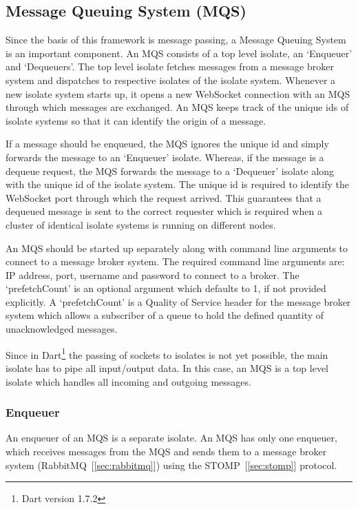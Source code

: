 \subsection{Message Queuing System (MQS)}
\label{subsec:mqs}
  Since the basis of this framework is message passing, a Message Queuing System is an important component. An MQS consists of a top level isolate, an ‘Enqueuer’ and ‘Dequeuers’. The top level isolate fetches messages from a message broker system and dispatches to respective isolates of the isolate system. Whenever a new isolate system starts up, it opens a new WebSocket connection with an MQS through which messages are exchanged. An MQS keeps track of the unique ids of isolate systems so that it can identify the origin of a message.

  If a message should be enqueued, the MQS ignores the unique id and simply forwards the message to an ‘Enqueuer’ isolate. Whereas, if the message is a dequeue request, the MQS forwards the message to a ‘Dequeuer’ isolate along with the unique id of the isolate system. The unique id is required to identify the WebSocket port through which the request arrived. This guarantees that a dequeued message is sent to the correct requester which is required when a cluster of identical isolate systems is running on different nodes.

  An MQS should be started up separately along with command line arguments to connect to a message broker system. The required command line arguments are: IP address, port, username and password to connect to a broker. The ‘prefetchCount’ is an optional argument which defaults to 1, if not provided explicitly. A ‘prefetchCount’ is a Quality of Service header for the message broker system which allows a subscriber of a queue to hold the defined quantity of unacknowledged messages.

Since in Dart\footnote{Dart version 1.7.2} the passing of sockets to isolates is not yet possible, the main isolate has to pipe all input/output data. In this case, an MQS is a top level isolate which handles all incoming and outgoing messages.

  \subsubsection{Enqueuer}
  An enqueuer of an MQS is a separate isolate. An MQS has only one enqueuer, which receives messages from the MQS and sends them to a message broker system (RabbitMQ~[\ref{sec:rabbitmq}]) using the STOMP~[\ref{sec:stomp}] protocol.

